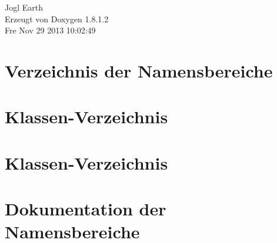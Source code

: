 \documentclass{book}
\begin{document}
\begin{titlepage}
\vspace*{7cm}
\begin{center}
{\Large Jogl Earth }\\
\vspace*{1cm}
{\large Erzeugt von Doxygen 1.8.1.2}\\
\vspace*{0.5cm}
{\small Fre Nov 29 2013 10:02:49}\\
\end{center}
\end{titlepage}
\clearemptydoublepage
{}
\tableofcontents
\clearemptydoublepage
{}
\chapter{Verzeichnis der Namensbereiche}

\chapter{Klassen-\/\-Verzeichnis}

\chapter{Klassen-\/\-Verzeichnis}

\chapter{Dokumentation der Namensbereiche}













\end{document}
